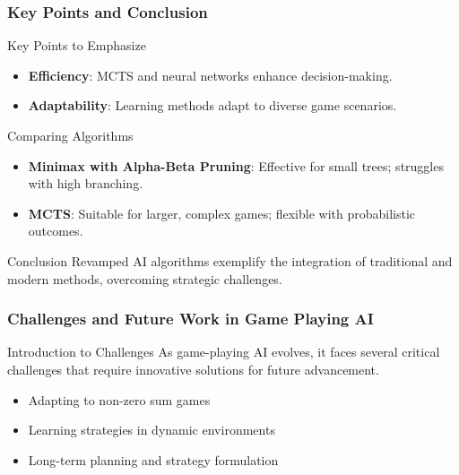 \documentclass[aspectratio=169]{beamer}
\begin{document}
\begin{frame}[fragile]
    \frametitle{Key Points and Conclusion}
    \begin{block}{Key Points to Emphasize}
        \begin{itemize}
            \item \textbf{Efficiency}: MCTS and neural networks enhance decision-making.
            \item \textbf{Adaptability}: Learning methods adapt to diverse game scenarios.
        \end{itemize}
    \end{block}

    \begin{block}{Comparing Algorithms}
        \begin{itemize}
            \item \textbf{Minimax with Alpha-Beta Pruning}: Effective for small trees; struggles with high branching.
            \item \textbf{MCTS}: Suitable for larger, complex games; flexible with probabilistic outcomes.
        \end{itemize}
    \end{block}
    
    \begin{block}{Conclusion}
        Revamped AI algorithms exemplify the integration of traditional and modern methods, overcoming strategic challenges.
    \end{block}
\end{frame}

\begin{frame}[fragile]
    \frametitle{Challenges and Future Work in Game Playing AI}
    \begin{block}{Introduction to Challenges}
        As game-playing AI evolves, it faces several critical challenges that require innovative solutions for future advancement.
    \end{block}
    \begin{itemize}
        \item Adapting to non-zero sum games
        \item Learning strategies in dynamic environments
        \item Long-term planning and strategy formulation
    \end{itemize}
\end{frame}
\end{document}

